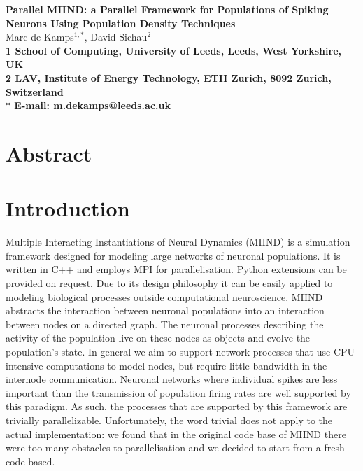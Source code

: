 \documentclass[12pt]{article}
\date{}
\begin{document}
\begin{center}
\thispagestyle{empty}
{\Large
\textbf{Parallel MIIND: a Parallel Framework for Populations of Spiking Neurons Using Population Density Techniques}
}
\vspace{1.0cm}
\\
Marc de Kamps$^{1,\ast}$, 
David Sichau$^{2}$
\vspace{0.5cm}
\\
\bf{1} School of Computing, University of Leeds, Leeds, West Yorkshire, UK
\\
\bf{2} LAV, Institute of Energy Technology, ETH Zurich, 8092 Zurich, Switzerland
\\
\vspace{0.5cm}
$\ast$ E-mail: m.dekamps@leeds.ac.uk
\end{center}

\section*{Abstract}


\newpage 
\setcounter{page}{1}
\linenumbers

\section{Introduction}
Multiple Interacting Instantiations of Neural Dynamics \citep{dekamps2008} (MIIND) is a simulation framework designed for modeling large networks of 
neuronal populations. It is written in C++ and employs MPI \citep{gropp1998} for parallelisation. Python extensions can be provided on request. 
Due to its design philosophy it can be easily applied to modeling 
biological processes outside computational neuroscience. MIIND abstracts the interaction between neuronal populations into an interaction 
between nodes on a directed graph. The neuronal processes describing the activity of the population live on these nodes as objects and evolve 
the population’s state. In general we aim to support network processes that use CPU-intensive computations to model nodes, but
require little bandwidth in the internode communication. Neuronal networks where individual spikes are less important than the transmission
of population firing rates are well supported by this paradigm. As such, the processes that are supported by this framework are trivially
parallelizable. Unfortunately, the word trivial does not apply to the actual implementation: we found that in the original code base of MIIND there
were too many obstacles to parallelisation and we decided to start from a fresh code based. 
\end{document}
